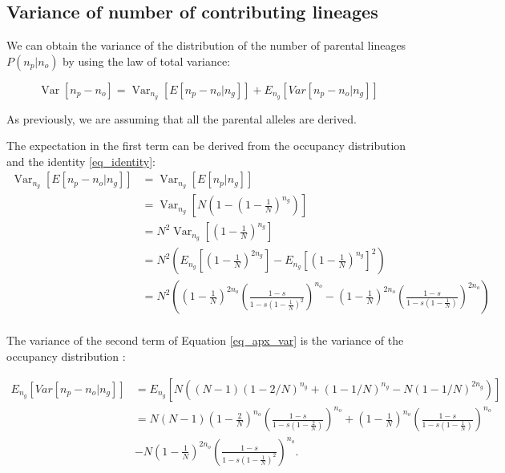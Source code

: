 \documentclass[review]{elsarticle}
\newcommand{\Var}{\operatorname{Var}}
\begin{document}
\subsection{Variance of number of contributing lineages}
\label{subsec_apx_variance}

We can obtain the variance of the distribution of the number of parental lineages $P(n_p | n_o)$ by using the law of total variance:

\begin{equation}
  \label{eq_apx_var}
\Var\left[n_p-n_o \right] = \Var_{n_g}\left[E\left[n_p-n_o | n_g \right]\right]+  E_{n_g}\left[Var\left[n_p-n_o | n_g \right]\right] 
\end{equation}

As previously, we are assuming that all the parental alleles are derived.

The expectation in the first term can be derived from the occupancy distribution and the identity
\ref{eq_identity}:
\begin{equation}
\begin{split}
\Var_{n_g}\left[E\left[n_p-n_o | n_g \right]\right] &= \Var_{n_g}\left[E\left[n_p| n_g \right]\right] \\
&= \Var_{n_g}\left[N\left(1-(1-\frac{1}{N})^{n_g} \right) \right] \\ 
&= N^2 \Var_{n_g}\left[(1-\frac{1}{N})^{n_g} \right] \\
&= N^2 \left( E_{n_g}\left[(1-\frac{1}{N})^{2n_g} \right] - E_{n_g}\left[(1-\frac{1}{N})^{n_g} \right]^2\right) \\
&= N^2 \left( \left(1-\frac{1}{N}\right)^{2n_o} \left(\frac{1-s}{1-s  \left(1-\frac{1}{N}\right)^2}\right)^{n_o} 
-   \left(1-\frac{1}{N}\right)^{2n_o} \left(\frac{1-s}{1-s  \left(1-\frac{1}{N}\right)}\right)^{2n_o} \right) \\
\end{split}
\end{equation}

The variance of the second term of Equation \eqref{eq_apx_var} is the variance of the occupancy distribution \cite{ref}:

\begin{equation}
\begin{split}
E_{n_g}\left[Var\left[n_p-n_o | n_g \right]\right] & = E_{n_g}\left[N ((N - 1) (1 - 2/N)^{n_g} + (1 - 1/N)^{n_g} - N (1 - 1/N)^{2 n_g}) \right] \\
& = N (N-1)  \left(1-\frac{2}{N}\right)^{n_o} \left(\frac{1- s}{1- s  \left(1-\frac{2}{N}\right)}\right)^{n_o} +  \left(1-\frac{1}{N}\right)^{n_o} \left(\frac{1- s}{1- s  \left(1-\frac{1}{N}\right)}\right)^{n_o} \\
&-N  \left(1-\frac{1}{N}\right)^{2n_o} \left(\frac{1-  s}{1- s  \left(1-\frac{1}{N}\right)^2}\right)^{n_o}. 
\end{split}
\end{equation}
\end{document}
